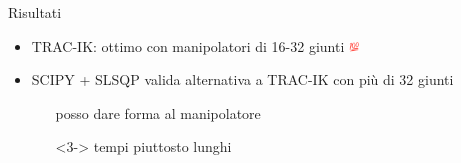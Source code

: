 \begin{frame}{Risultati}
\begin{itemize}
\item<1-> TRAC-IK: ottimo con manipolatori di 16-32 giunti \includegraphics[width=10px]{slide/img_cinematica_inversa/hundred_point_emoji.png}
\item<2-> SCIPY + SLSQP valida alternativa a TRAC-IK con più di 32 giunti
\begin{itemize}
    \item[\leftthumbsup] posso dare forma al manipolatore
    \item[\leftthumbsdown]<3-> tempi piuttosto lunghi
\end{itemize}
\end{itemize}

\end{frame}